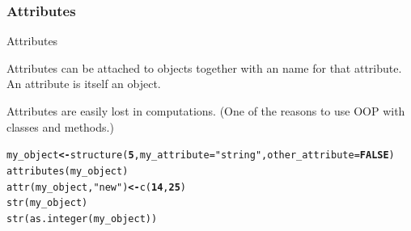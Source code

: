 \documentclass{beamer}\usepackage[]{graphicx}\usepackage[]{color}
\makeatletter
\newcommand{\hlnum}[1]{\textcolor[rgb]{0.502,0,0.502}{\textbf{#1}}}%
\newcommand{\hlstr}[1]{\textcolor[rgb]{0.651,0.522,0}{#1}}%
\newcommand{\hlstd}[1]{\textcolor[rgb]{0,0,0}{#1}}%
\newcommand{\hlkwb}[1]{\textcolor[rgb]{0.502,0.502,0.753}{\textbf{#1}}}%
\newcommand{\hlkwc}[1]{\textcolor[rgb]{0,0.502,0.753}{#1}}%
\newcommand{\hlkwd}[1]{\textcolor[rgb]{0,0.267,0.4}{#1}}%
\newenvironment{kframe}{%
 \def\at@end@of@kframe{}%
 \ifinner\ifhmode%
  \def\at@end@of@kframe{\end{minipage}}%
  \begin{minipage}{\columnwidth}%
 \fi\fi%
 \def\FrameCommand##1{\hskip\@totalleftmargin \hskip-\fboxsep
 \colorbox{shadecolor}{##1}\hskip-\fboxsep
     \hskip-\linewidth \hskip-\@totalleftmargin \hskip\columnwidth}%
 \MakeFramed {\advance\hsize-\width
   \@totalleftmargin\z@ \linewidth\hsize
   \@setminipage}}%
 {\par\unskip\endMakeFramed%
 \at@end@of@kframe}
\newenvironment{knitrout}{}{} %
\makeatother
\begin{document}
\subsubsection{Attributes}


\begin{frame}[fragile]{Attributes}

Attributes can be attached to objects together with an name for that attribute. An attribute is itself an object. 

Attributes are easily lost in computations. (One of the reasons to use OOP with classes and methods.)

\begin{knitrout}
\color{fgcolor}\begin{kframe}
\begin{alltt}
\hlstd{my_object} \hlkwb{<-} \hlkwd{structure}\hlstd{(}\hlnum{5}\hlstd{,} \hlkwc{my_attribute} \hlstd{=} \hlstr{"string"}\hlstd{,} \hlkwc{other_attribute} \hlstd{=} \hlnum{FALSE}\hlstd{)}
\hlkwd{attributes}\hlstd{(my_object)}
\hlkwd{attr}\hlstd{(my_object,} \hlstr{"new"}\hlstd{)} \hlkwb{<-} \hlkwd{c}\hlstd{(}\hlnum{14}\hlstd{,} \hlnum{25}\hlstd{)}
\hlkwd{str}\hlstd{(my_object)}
\hlkwd{str}\hlstd{(}\hlkwd{as.integer}\hlstd{(my_object))}
\end{alltt}
\end{kframe}
\end{knitrout}

\end{frame}
\end{document}
